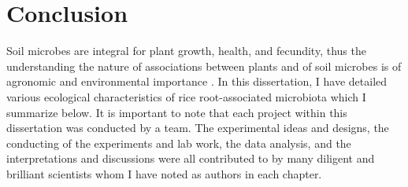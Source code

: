 \chapter{Conclusion}
Soil microbes are integral for plant growth, health, and fecundity, thus the understanding the nature of associations between plants and of soil microbes is of agronomic and environmental importance \cite{Berendsen2012,Bulgarelli2013,Schlaeppi2015,Wagner2014}. In this dissertation, I have detailed various ecological characteristics of rice root-associated microbiota which I summarize below. It is important to note that each project within this dissertation was conducted by a team. The experimental ideas and designs, the conducting of the experiments and lab work, the data analysis, and the interpretations and discussions were all contributed to by many diligent and brilliant scientists whom I have noted as authors in each chapter.

